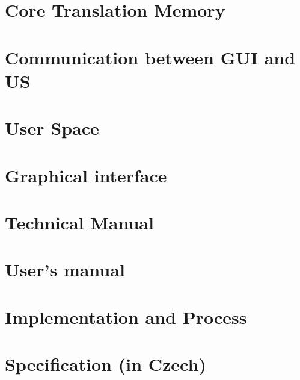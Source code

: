 \documentclass[11pt, oneside]{book}
\begin{document}
\chapter{Core Translation Memory}


\chapter{Communication between GUI and US}


\chapter{User Space}


\chapter{Graphical interface}


\chapter{Technical Manual}


\chapter{User's manual}


\chapter{Implementation and Process}


\appendix
\chapter{Specification (in Czech)}

\end{document}
